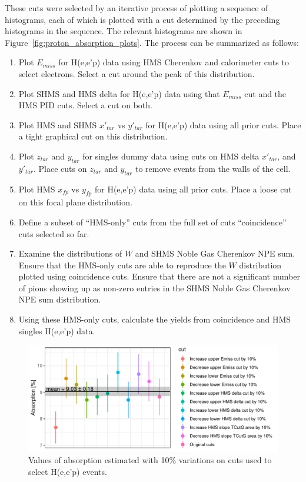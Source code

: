 These cuts were selected by an iterative process of plotting a sequence of
histograms, each of which is plotted with a cut determined by the preceding
histograms in the sequence.
The relevant histograms are shown in Figure~\ref{fig:proton_absorption_plots}.
The process can be summarized as follows:
\begin{enumerate}
    \item Plot $E_{miss}$ for H(e,e'p) data using HMS Cherenkov and calorimeter cuts to select
        electrons. Select a cut around the peak of this distribution.
    \item Plot SHMS and HMS delta for H(e,e'p) data using that $E_{miss}$ cut and the HMS PID
        cuts. Select a cut on both.
    \item Plot HMS and SHMS $x'_{tar}$ vs $y'_{tar}$ for H(e,e'p) data using all prior cuts. Place
        a tight graphical cut on this distribution.
    \item Plot $z_{tar}$ and $y_{tar}$ for singles dummy data using cuts on HMS delta
        $x'_{tar}$, and $y'_{tar}$. Place cuts on $z_{tar}$ and $y_{tar}$ to
        remove events from the walls of the cell.
    \item Plot HMS $x_{fp}$ vs $y_{fp}$ for H(e,e'p) data using all prior cuts.
        Place a loose cut on this focal plane distribution.
    \item Define a subset of ``HMS-only'' cuts from the full set of cuts
        ``coincidence'' cuts selected so far.
    \item Examine the distributions of $W$ and SHMS Noble Gas Cherenkov NPE sum.
        Ensure that the HMS-only cuts are able to reproduce the $W$ distribution
        plotted using coincidence cuts. Ensure that there are not a significant
        number of pions showing up as non-zero entries in the SHMS Noble Gas
        Cherenkov NPE sum distribution.
    \item Using these HMS-only cuts, calculate the yields from coincidence and
        HMS singles H(e,e'p) data.
\end{enumerate}


\begin{figure}[!h]
    \centering
    \includegraphics[width=1.0\textwidth]{chap4/proton_absorption_cut_study.pdf}
    \caption{Values of absorption estimated with 10\% variations on cuts used
             to select H(e,e'p) events.}
    \label{fig:proton_absorption_cut_study}
\end{figure}

